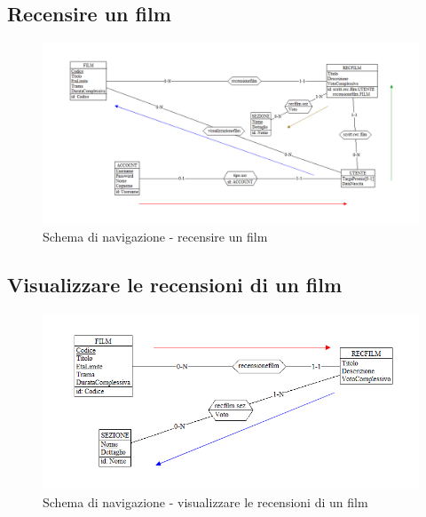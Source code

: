 \documentclass[a4paper,12pt]{report}
\begin{document}
	\subsection{Recensire un film}
	\begin{figure}[H]
		\centering
		\includegraphics[width=450pt]{ER/navigazione/recensionefilm.png}
		\caption{Schema di navigazione - recensire un film}
	\end{figure}
	
	\subsection{Visualizzare le recensioni di un film}
	\begin{figure}[H]
		\centering
		\includegraphics[width=450pt]{ER/navigazione/visualrecensionifilm.png}
		\caption{Schema di navigazione - visualizzare le recensioni di un film}
	\end{figure}
\end{document}
